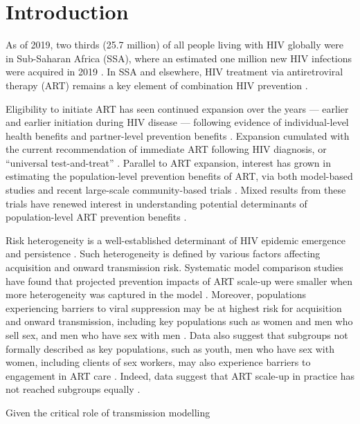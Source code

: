 \section{Introduction}
As of 2019, two thirds (25.7 million) of all people living with HIV globally
were in Sub-Saharan Africa (SSA), where
an estimated one million new HIV infections were acquired in 2019 \cite{AIDSinfo}.
In SSA and elsewhere, HIV treatment via antiretroviral therapy (ART)
remains a key element of combination HIV prevention \cite{WHO2016art}.
\par
Eligibility to initiate ART has seen continued expansion over the years
--- \ie earlier and earlier initiation during HIV disease ---
following evidence of individual-level health benefits \cite{Lundgren2015,Danel2015}
and partner-level prevention benefits \cite{Anglemyer2013,Cohen2016}.
Expansion cumulated with the current recommendation of
immediate ART following HIV diagnosis, or ``universal test-and-treat'' \cite{WHO2016art}.
Parallel to ART expansion, interest has grown in estimating
the population-level prevention benefits of ART, via both
model-based studies \cite{Granich2009,Eaton2012,Delva2012,Cori2014} and
recent large-scale community-based trials \cite{Havlir2019,Hayes2019,Iwuji2018}.
Mixed results from these trials \cite{Havlir2019,Hayes2019,Iwuji2018}
have renewed interest in understanding potential determinants of
population-level ART prevention benefits \cite{Baral2019,Havlir2020}.
\par
Risk heterogeneity is a well-established determinant of
HIV epidemic emergence and persistence \cite{Anderson1986,Boily1997}.
Such heterogeneity is defined by various factors affecting acquisition and onward transmission risk.
Systematic model comparison studies have found that projected prevention impacts of ART scale-up
were smaller when more heterogeneity was captured in the model \cite{Hontelez2013,Rozhnova2016}.
Moreover, populations experiencing barriers to viral suppression
may be at highest risk for acquisition and onward transmission, including key populations such as
women and men who sell sex, and men who have sex with men \cite{Hakim2018,Nyato2019}.
Data also suggest that subgroups not formally described as key populations,
such as youth, men who have sex with women, including clients of sex workers, may also
experience barriers to engagement in ART care \cite{Arnesen2017,Chikwari2018,Quinn2019}.
Indeed, data suggest that ART scale-up in practice
has not reached subgroups equally \cite{Green2020}.
\par
Given the critical role of transmission modelling
